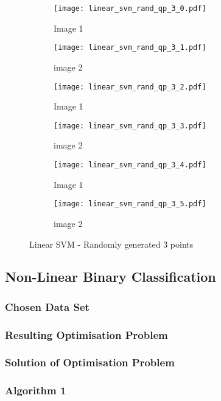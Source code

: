 \documentclass[10pt, a4paper,reqno]{amsart}
\begin{document}
\begin{figure}[H]
	\centering	
	\begin{subfigure}{0.5\textwidth}
		\centering
		\texttt{[image: linear\_svm\_rand\_qp\_3\_0.pdf]}
		\caption{Image 1}
	\end{subfigure}%
	\begin{subfigure}{0.5\textwidth}
		\centering
		\texttt{[image: linear\_svm\_rand\_qp\_3\_1.pdf]}
		\caption{image 2}
	\end{subfigure}
	\begin{subfigure}{0.5\textwidth}
		\centering
		\texttt{[image: linear\_svm\_rand\_qp\_3\_2.pdf]}
		\caption{Image 1}
	\end{subfigure}%
	\begin{subfigure}{0.5\textwidth}
		\centering
		\texttt{[image: linear\_svm\_rand\_qp\_3\_3.pdf]}
		\caption{image 2}
	\end{subfigure}
	\begin{subfigure}{0.5\textwidth}
		\centering
		\texttt{[image: linear\_svm\_rand\_qp\_3\_4.pdf]}
		\caption{Image 1}
	\end{subfigure}%
	\begin{subfigure}{0.5\textwidth}
		\centering
		\texttt{[image: linear\_svm\_rand\_qp\_3\_5.pdf]}
		\caption{image 2}
	\end{subfigure}
	\caption{Linear SVM - Randomly generated 3 points}
\end{figure}


\subsection{Non-Linear Binary Classification}


\subsubsection{Chosen Data Set}


\subsubsection{Resulting Optimisation Problem}


\subsubsection{Solution of Optimisation Problem}


\subsubsection{Algorithm 1}
\end{document}
